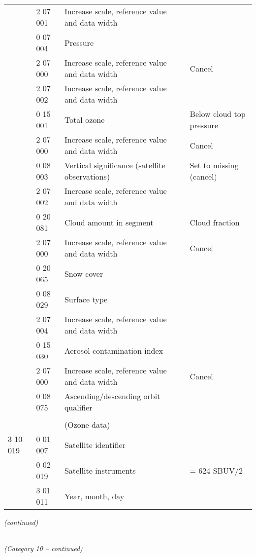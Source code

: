 \begin{longtable}[]{@{}llll@{}}
& 2 07 001 & Increase scale, reference value and data width &\tabularnewline
& 0 07 004 & Pressure &\tabularnewline
& 2 07 000 & Increase scale, reference value and data width & Cancel\tabularnewline
& 2 07 002 & Increase scale, reference value and data width &\tabularnewline
& 0 15 001 & Total ozone & Below cloud top pressure\tabularnewline
& 2 07 000 & Increase scale, reference value and data width & Cancel\tabularnewline
& 0 08 003 & Vertical significance (satellite observations) & Set to missing (cancel)\tabularnewline
& 2 07 002 & Increase scale, reference value and data width &\tabularnewline
& 0 20 081 & Cloud amount in segment & Cloud fraction\tabularnewline
& 2 07 000 & Increase scale, reference value and data width & Cancel\tabularnewline
& 0 20 065 & Snow cover &\tabularnewline
& 0 08 029 & Surface type &\tabularnewline
& 2 07 004 & Increase scale, reference value and data width &\tabularnewline
& 0 15 030 & Aerosol contamination index &\tabularnewline
& 2 07 000 & Increase scale, reference value and data width & Cancel\tabularnewline
& 0 08 075 & Ascending/descending orbit qualifier &\tabularnewline
& & &\tabularnewline
& & (Ozone data) &\tabularnewline
3 10 019 & 0 01 007 & Satellite identifier &\tabularnewline
& 0 02 019 & Satellite instruments & = 624 SBUV/2\tabularnewline
& 3 01 011 & Year, month, day &\tabularnewline
\bottomrule
\end{longtable}

\emph{(continued)}

\emph{\\
(Category 10 -- continued)}

